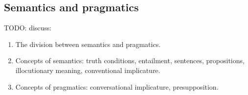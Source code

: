 \documentclass{scrarticle}
\begin{document}
\subsection{Semantics and pragmatics}

\large{TODO:} discuss:
\begin{enumerate}
    \item The division between semantics and pragmatics.
    \item Concepts of semantics: truth conditions, entailment, sentences, propositions,
	illocutionary meaning, conventional implicature.
    \item Concepts of pragmatics: conversational implicature, presupposition.
\end{enumerate}
\end{document}
